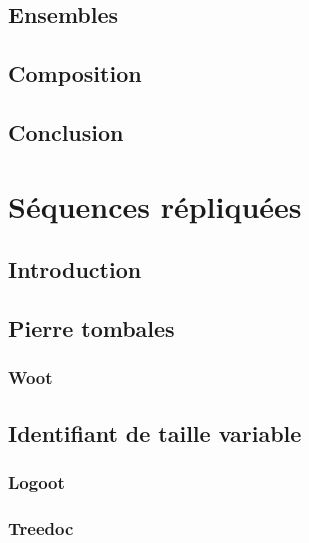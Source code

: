 \section{Ensembles}
\section{Composition}
\section{Conclusion}

\chapter{Séquences répliquées}
\section{Introduction}
\section{Pierre tombales}
\subsection{Woot}
\section{Identifiant de taille variable}
\subsection{Logoot}
\subsection{Treedoc}


